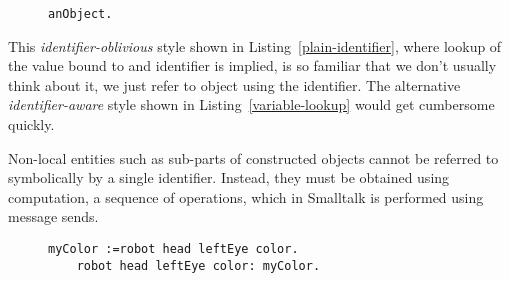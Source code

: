 \documentclass[preprint,authoryear]{acm_proc_article-sp}
\begin{document}

\begin{figure}[htbp]
\begin{lstlisting}[style=L,label=plain-identifier,caption=Identifier-oblivious variable lookup.]
  anObject.
\end{lstlisting}
\end{figure}

This  {\em identifier-oblivious} style shown in Listing~\ref{plain-identifier}, where lookup of the value bound to and
identifier is implied, is so familiar that we don't usually think about it, we just
refer to object using the identifier.
The alternative {\em identifier-aware} style shown in Listing~\ref{variable-lookup} would get cumbersome quickly.

Non-local entities such as sub-parts of constructed objects 
cannot be referred to symbolically by a single identifier.
Instead, they must be obtained using computation, a 
sequence of operations, which in Smalltalk is performed using message sends.


\begin{figure}[htbp]
\begin{lstlisting}[style=L,label=non-local-reference,caption=Accessing objects via chained message sends.]
	myColor :=robot head leftEye color.
	robot head leftEye color: myColor.
\end{lstlisting}
\end{figure}
\end{document}
